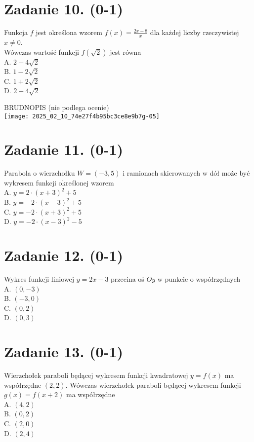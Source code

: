 \documentclass[10pt]{article}
\begin{document}
\section*{Zadanie 10. (0-1)}
Funkcja \(f\) jest określona wzorem \(f(x)=\frac{2 x-8}{x}\) dla każdej liczby rzeczywistej \(x \neq 0\).\\
Wówczas wartość funkcji \(f(\sqrt{2})\) jest równa\\
A. \(2-4 \sqrt{2}\)\\
B. \(1-2 \sqrt{2}\)\\
C. \(1+2 \sqrt{2}\)\\
D. \(2+4 \sqrt{2}\)

BRUDNOPIS (nie podlega ocenie)\\
\texttt{[image: 2025\_02\_10\_74e27f4b95bc3ce8e9b7g-05]}

\section*{Zadanie 11. (0-1)}
Parabola o wierzchołku \(W=(-3,5)\) i ramionach skierowanych w dół może być wykresem funkcji określonej wzorem\\
A. \(y=2 \cdot(x+3)^{2}+5\)\\
B. \(y=-2 \cdot(x-3)^{2}+5\)\\
C. \(y=-2 \cdot(x+3)^{2}+5\)\\
D. \(y=-2 \cdot(x-3)^{2}-5\)

\section*{Zadanie 12. (0-1)}
Wykres funkcji liniowej \(y=2 x-3\) przecina oś \(O y\) w punkcie o współrzędnych\\
A. \((0,-3)\)\\
B. \((-3,0)\)\\
C. \((0,2)\)\\
D. \((0,3)\)

\section*{Zadanie 13. (0-1)}
Wierzchołek paraboli będącej wykresem funkcji kwadratowej \(y=f(x)\) ma współrzędne \((2,2)\). Wówczas wierzchołek paraboli będącej wykresem funkcji \(g(x)=f(x+2)\) ma współrzędne\\
A. \((4,2)\)\\
B. \((0,2)\)\\
C. \((2,0)\)\\
D. \((2,4)\)
\end{document}
